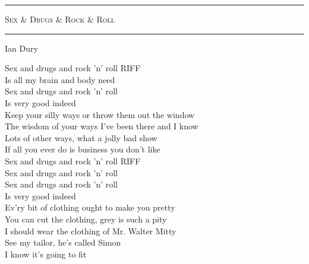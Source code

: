 \documentclass[10pt, twoside, a4paper]{article}
\begin{document}
\begin{center}

	\hrule \vspace{0.2cm}
     	\textsc{\LARGE Sex \& Drugs \& Rock \& Roll}
	\vspace{0.2cm} \hrule \vspace{0.2cm}
      	{\large Ian Dury}
      	
\end{center}


		
Sex and drugs and rock 'n' roll	\hfill	RIFF \\
Is all my brain and body need \\
Sex and drugs and rock 'n' roll \\
Is very good indeed \\

Keep your silly ways
or throw them out the window  \\
The wisdom of your ways
I've been there and I know  \\
Lots of other ways,
what a jolly bad show \\
If all you ever do
is business you don't like \\

Sex and drugs and rock 'n' roll	\hfill	RIFF \\
Sex and drugs and rock 'n' roll \\
Sex and drugs and rock 'n' roll \\
Is very good indeed \\

Ev'ry bit of clothing ought to make you pretty \\
You can cut the clothing, grey is such a pity \\
I should wear the clothing of Mr. Walter Mitty \\
See my tailor, he's called Simon \\
I know it's going to fit \\
\end{document}
